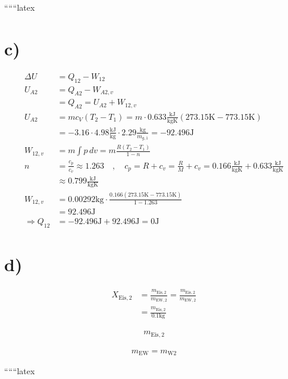 ``````latex


\section*{c)}

\begin{align*}
\Delta U &= Q_{12} - W_{12} \\
U_{A2} &= Q_{A2} - W_{A2,v} \\
&= Q_{A2} = U_{A2} + W_{12,v} \\
U_{A2} &= mc_V (T_2 - T_1) = m \cdot 0.633 \frac{\text{kJ}}{\text{kgK}} \left( 273.15 \text{K} - 773.15 \text{K} \right) \\
&= -3.16 \cdot 4.98 \frac{\text{kJ}}{\text{kg}} \cdot 2.29 \frac{\text{kg}}{m_{g,1}} = -92.496 \text{J} \\
W_{12,v} &= m \int p \, dv = m \frac{R (T_2 - T_1)}{1 - n} \\
n &= \frac{c_p}{c_v} \approx 1.263 \quad , \quad c_p = R + c_v = \frac{R}{M} + c_v = 0.166 \frac{\text{kJ}}{\text{kgK}} + 0.633 \frac{\text{kJ}}{\text{kgK}} \\
&\approx 0.799 \frac{\text{kJ}}{\text{kgK}} \\
W_{12,v} &= 0.00292 \text{kg} \cdot \frac{0.166 (273.15 \text{K} - 773.15 \text{K})}{1 - 1.263} \\
&= 92.496 \text{J} \\
\Rightarrow Q_{12} &= -92.496 \text{J} + 92.496 \text{J} = 0 \text{J}
\end{align*}

\section*{d)}

\begin{align*}
X_{\text{Eis},2} &= \frac{m_{\text{Eis},2}}{m_{\text{EW},2}} = \frac{m_{\text{Eis},2}}{m_{\text{EW},2}} \\
&= \frac{m_{\text{Eis},2}}{0.1 \text{kg}}
\end{align*}

\begin{align*}
m_{\text{Eis},2}
\end{align*}

\begin{align*}
m_{\text{EW}} = m_{\text{W2}}
\end{align*}

``````latex



